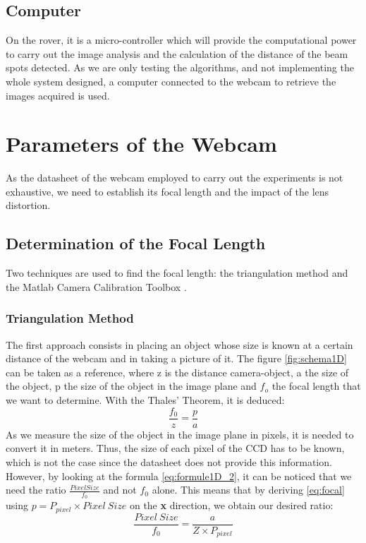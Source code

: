 \subsection{Computer}
On the rover, it is a micro-controller which will provide the computational power to carry out the image analysis and the calculation of the distance of the beam spots detected. As we are only testing the algorithms, and not implementing the whole system designed, a computer connected to the webcam to retrieve the images acquired is used. 

\section{Parameters of the Webcam}
As the datasheet of the webcam employed to carry out the experiments is not exhaustive, we need to establish its focal length and the impact of the lens distortion.

\subsection{Determination of the Focal Length}
Two techniques are used to find the focal length: the triangulation method and the Matlab Camera Calibration Toolbox \cite{matlabtoolbox}.

\subsubsection{Triangulation Method}
The first approach consists in placing an object whose size is known at a certain distance of the webcam and in taking a picture of it. The figure \ref{fig:schema1D} can be taken as a reference, where z is the distance camera-object, a the size of the object, p the size of the object in the image plane and $f_o$ the focal length that we want to determine. With the Thales' Theorem, it is deduced:
\begin{equation}
\frac{f_0}{z} = \frac{p}{a}
\label{eq:focal}
\end{equation}
As we measure the size of the object in the image plane in pixels, it is needed to convert it in meters. Thus, the size of each pixel of the CCD has to be known, which is not the case since the datasheet does not provide this information. However, by looking at the formula \eqref{eq:formule1D_2}, it can be noticed that we need the ratio $\frac{Pixel Size}{f_0}$ and not $f_0$ alone. This means that by deriving \eqref{eq:focal} using $p = P_{pixel} \times Pixel \ Size$ on the \textbf{x} direction, we obtain our desired ratio:
\begin{equation*}
\frac{Pixel \ Size}{f_0} = \frac{a}{Z \times P_{pixel}}
\end{equation*}


